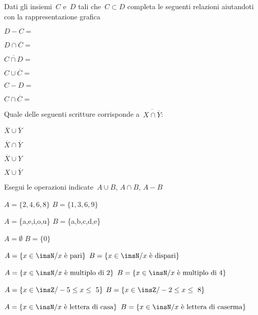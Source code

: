 \begin{esercizio}
\label{ese:7.55}
Dati gli insiemi~$C$ e~$D$ tali che~$C\subset D$
completa le seguenti relazioni aiutandoti con la rappresentazione
grafica
\vspace{-6pt}
\begin{multicols}{3}
\begin{enumeratea}
\item $D-C=$
\item $D\cap \overline{C}=$
\item $\overline{{C\cap D}}=$
\item $C\cup \overline{C}=$
\item $C-D=$
\item $C\cap \overline{C}=$
\end{enumeratea}
\end{multicols}
\end{esercizio}

\begin{esercizio}
\label{ese:7.56}
Quale delle seguenti scritture corrisponde a~$\overline{{X\cap \overline{Y}}}$:
\vspace{-6pt}
\begin{multicols}{4}
 \begin{enumeratea}
 \item $\overline{X}\cup \overline{Y}$
 \item $\overline{X}\cap \overline{Y}$
 \item $\overline{X}\cup Y$
 \item $X\cup \overline{Y}$
 \end{enumeratea}
\end{multicols}
\end{esercizio}


\begin{esercizio}
\label{ese:7.57}
Esegui le operazioni indicate~$A\cup B$, $A\cap B$, $A-B$
\vspace{-6pt}

\begin{enumeratea}
\item $A=\{2,4,6,8\}$ $B=\{1,3,6,9\}$
\item $A=$\{a,e,i,o,u\} $B=$\{a,b,c,d,e\}
\item $A=\emptyset $ $B=\{0\}$
\item $A=\{x\in\insN/ x\text{ è pari}\}$ $B=\{x\in\insN/ x\text{ è dispari}\}$
\item $A=\{x\in\insN/ x\text{ è multiplo di~2}\}$ $B=\{x\in\insN/ x\text{ è 
multiplo di~4}\}$
\item $A=\{x\in\insZ/-5\le x\le~5\}$ $B=\{x\in\insZ/-2\le x\le~8\}$
\item $A=\{x\in\insN/ x\text{ è lettera di casa}\}$ $B=\{x\in\insN/ x\text{ è 
lettera di caserma}\}$
\end{enumeratea}
\end{esercizio}

